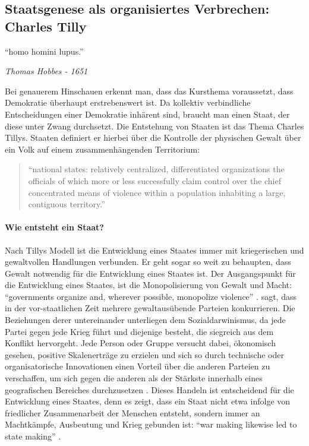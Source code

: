 \subsection{Staatsgenese als organisiertes Verbrechen: Charles Tilly}

\epigraph{
		``homo homini lupus.''}
	{
		\emph{Thomas Hobbes - 1651
	}

Bei genauerem Hinschauen erkennt man, dass das Kursthema voraussetzt, dass Demokratie überhaupt erstrebenswert ist.
Da kollektiv verbindliche Entscheidungen einer Demokratie inhärent sind, braucht man einen Staat, der diese unter Zwang durchsetzt.
Die Entstehung von Staaten ist das Thema Charles Tillys.
Staaten definiert er hierbei über die Kontrolle der physischen Gewalt über ein Volk auf einem zusammenhängenden Territorium:

	\begin{quote}
		``national states: relatively centralized, differentiated organizations the officials of which more or less successfully claim control over the chief concentrated means of violence within a population inhabiting a large, contiguous territory.'' \citep[170]{Tilly-1985-aa}
\end{quote}

\paragraph{Wie entsteht ein Staat?}
Nach Tillys Modell ist die Entwicklung eines Staates immer mit kriegerischen und gewaltvollen Handlungen verbunden.
Er geht sogar so weit zu behaupten, dass Gewalt notwendig für die Entwicklung eines Staates ist.
Der Ausgangspunkt für die Entwicklung eines Staates, ist die Monopolisierung von Gewalt und Macht: ``governments organize and, wherever possible, monopolize violence'' \citep[171]{Tilly-1985-aa}.
\citeauthor{Tilly-1985-aa} sagt, dass in der vor-staatlichen Zeit mehrere gewaltausübende Parteien konkurrieren.
Die Beziehungen derer untereinander unterliegen dem Sozialdarwinismus, da jede Partei gegen jede Krieg führt und diejenige besteht, die  siegreich aus dem Konflikt hervorgeht. Jede Person oder Gruppe versucht dabei, ökonomisch gesehen, positive Skalenerträge zu erzielen und sich so durch technische oder organisatorische Innovationen einen Vorteil über die anderen Parteien zu verschaffen, um sich gegen die anderen als der Stärkste innerhalb eines geografischen Bereiches durchzusetzen \citep[vgl.][173]{Tilly-1985-aa}.
Dieses Handeln ist entscheidend für die Entwicklung eines Staates, denn es zeigt, dass ein Staat nicht etwa infolge von friedlicher Zusammenarbeit der Menschen entsteht, sondern immer an Machtkämpfe, Ausbeutung und Krieg gebunden ist: ``war making likewise led to state making'' \citep[183]{Tilly-1985-aa}.

}
